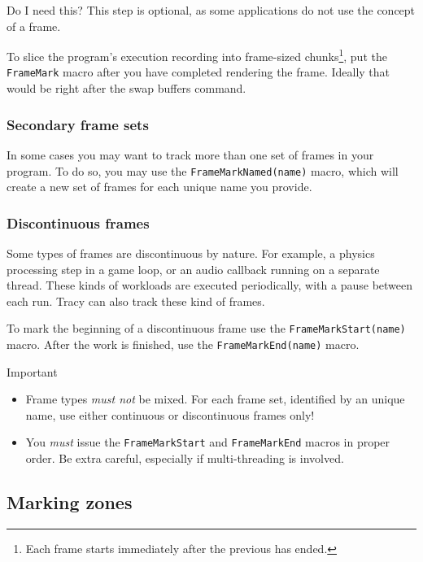 \documentclass[hidelinks,titlepage,a4paper]{article}
\begin{document}
\begin{bclogo}[
noborder=true,
couleur=black!5,
logo=\bclampe
]{Do I need this?}
This step is optional, as some applications do not use the concept of a frame.
\end{bclogo}

To slice the program's execution recording into frame-sized chunks\footnote{Each frame starts immediately after the previous has ended.}, put the \texttt{FrameMark} macro after you have completed rendering the frame. Ideally that would be right after the swap buffers command.

\subsubsection{Secondary frame sets}

In some cases you may want to track more than one set of frames in your program. To do so, you may use the \texttt{FrameMarkNamed(name)} macro, which will create a new set of frames for each unique name you provide.

\subsubsection{Discontinuous frames}

Some types of frames are discontinuous by nature. For example, a physics processing step in a game loop, or an audio callback running on a separate thread. These kinds of workloads are executed periodically, with a pause between each run. Tracy can also track these kind of frames.

To mark the beginning of a discontinuous frame use the \texttt{FrameMarkStart(name)} macro. After the work is finished, use the \texttt{FrameMarkEnd(name)} macro.

\begin{bclogo}[
noborder=true,
couleur=black!5,
logo=\bcbombe
]{Important}
\begin{itemize}
\item Frame types \emph{must not} be mixed. For each frame set, identified by an unique name, use either continuous or discontinuous frames only!
\item You \emph{must} issue the \texttt{FrameMarkStart} and \texttt{FrameMarkEnd} macros in proper order. Be extra careful, especially if multi-threading is involved.
\end{itemize}
\end{bclogo}

\subsection{Marking zones}
\end{document}
